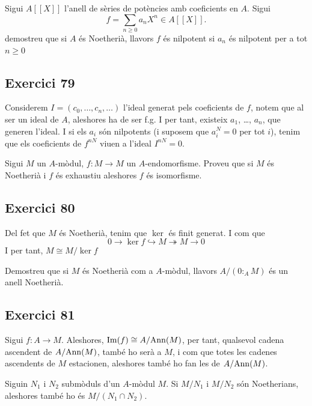 \documentclass[11pt, a4paper]{article}
\begin{document}
\newpage
\begin{tcolorbox}[title=\section{Exercici 79}]
    \sloppy
    Sigui $A[[X]]$ l'anell de sèries de potències amb coeficients en $A$. Sigui 
    \[f=\sum_{n\geq 0}a_nX^n\in A[[X]].\] demostreu que si $A$ és Noetherià, llavors $f$ és nilpotent si $a_n$ és nilpotent per a tot $n\geq0$
\end{tcolorbox}
\subsection{Exercici 79}
Considerem $I=(c_0, \dots, c_n, \dots)$ l'ideal generat pels coeficients de $f$, notem que al ser un ideal de $A$, aleshores ha de ser f.g. I per tant, existeix $a_1$, \dots, $a_n$, que generen l'ideal. I si els $a_i$ són nilpotents (i suposem que $a_i^N=0$ per tot $i$), tenim que els coeficients de $f^{nN}$ viuen a l'ideal $I^{nN}=0$.
\newpage
\begin{tcolorbox}[title=\section{Exercici 80}]
    Sigui $M$ un $A$-mòdul, $f\colon M\to M$ un $A$-endomorfisme. Proveu que si $M$ és Noetherià i $f$ és exhaustiu aleshores $f$ és isomorfisme.
\end{tcolorbox}
\subsection{Exercici 80}
Del fet que $M$ és Noetherià, tenim que $\ker$ és finit generat. I com que
\[
    0\to \ker f\hookrightarrow M\twoheadrightarrow  M\to 0
\]
I per tant, $M\cong M/\ker f $
\newpage
\begin{tcolorbox}[title=\section{Exercici 81}]
    Demostreu que si $M$ és Noetherià com a $A$-mòdul, llavors $A/(0:_AM)$ és un anell Noetherià.
\end{tcolorbox}
\subsection{Exercici 81}
Sigui $f:A\to M$. Aleshores, $\operatorname{Im}(f)\cong A/\mathrm{Ann}(M)$, per tant, qualsevol cadena ascendent de $A/\mathrm{Ann}(M)$, també ho serà a $M$, i com que totes les cadenes ascendents de $M$ estacionen, aleshores també ho fan les de $A/\mathrm{Ann}(M)$.
\newpage
\begin{tcolorbox}[title=\section{Exercici 82}]
    Siguin $N_1$ i $N_2$ submòduls d'un $A$-mòdul $M$. Si $M/N_1$ i $M/N_2$ són Noetherians, aleshores també ho és $M/(N_1\cap N_2)$.
\end{tcolorbox}
\end{document}
